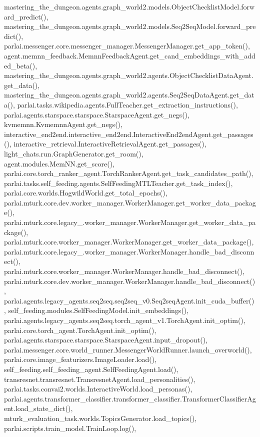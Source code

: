 mastering\+\_\+the\+\_\+dungeon.\+agents.\+graph\+\_\+world2.\+models.\+Object\+Checklist\+Model.\+forward\+\_\+predict(), mastering\+\_\+the\+\_\+dungeon.\+agents.\+graph\+\_\+world2.\+models.\+Seq2\+Seq\+Model.\+forward\+\_\+predict(), parlai.\+messenger.\+core.\+messenger\+\_\+manager.\+Messenger\+Manager.\+get\+\_\+app\+\_\+token(), agent.\+memnn\+\_\+feedback.\+Memnn\+Feedback\+Agent.\+get\+\_\+cand\+\_\+embeddings\+\_\+with\+\_\+added\+\_\+beta(), mastering\+\_\+the\+\_\+dungeon.\+agents.\+graph\+\_\+world2.\+agents.\+Object\+Checklist\+Data\+Agent.\+get\+\_\+data(), mastering\+\_\+the\+\_\+dungeon.\+agents.\+graph\+\_\+world2.\+agents.\+Seq2\+Seq\+Data\+Agent.\+get\+\_\+data(), parlai.\+tasks.\+wikipedia.\+agents.\+Full\+Teacher.\+get\+\_\+extraction\+\_\+instructions(), parlai.\+agents.\+starspace.\+starspace.\+Starspace\+Agent.\+get\+\_\+negs(), kvmemnn.\+Kvmemnn\+Agent.\+get\+\_\+negs(), interactive\+\_\+end2end.\+interactive\+\_\+end2end.\+Interactive\+End2end\+Agent.\+get\+\_\+passages(), interactive\+\_\+retrieval.\+Interactive\+Retrieval\+Agent.\+get\+\_\+passages(), light\+\_\+chats.\+run.\+Graph\+Generator.\+get\+\_\+room(), agent.\+modules.\+Mem\+N\+N.\+get\+\_\+score(), parlai.\+core.\+torch\+\_\+ranker\+\_\+agent.\+Torch\+Ranker\+Agent.\+get\+\_\+task\+\_\+candidates\+\_\+path(), parlai.\+tasks.\+self\+\_\+feeding.\+agents.\+Self\+Feeding\+M\+T\+L\+Teacher.\+get\+\_\+task\+\_\+index(), parlai.\+core.\+worlds.\+Hogwild\+World.\+get\+\_\+total\+\_\+epochs(), parlai.\+mturk.\+core.\+dev.\+worker\+\_\+manager.\+Worker\+Manager.\+get\+\_\+worker\+\_\+data\+\_\+package(), parlai.\+mturk.\+core.\+legacy\+\_.\+worker\+\_\+manager.\+Worker\+Manager.\+get\+\_\+worker\+\_\+data\+\_\+package(), parlai.\+mturk.\+core.\+worker\+\_\+manager.\+Worker\+Manager.\+get\+\_\+worker\+\_\+data\+\_\+package(), parlai.\+mturk.\+core.\+legacy\+\_.\+worker\+\_\+manager.\+Worker\+Manager.\+handle\+\_\+bad\+\_\+disconnect(), parlai.\+mturk.\+core.\+worker\+\_\+manager.\+Worker\+Manager.\+handle\+\_\+bad\+\_\+disconnect(), parlai.\+mturk.\+core.\+dev.\+worker\+\_\+manager.\+Worker\+Manager.\+handle\+\_\+bad\+\_\+disconnect(), parlai.\+agents.\+legacy\+\_\+agents.\+seq2seq.\+seq2seq\+\_\+v0.\+Seq2seq\+Agent.\+init\+\_\+cuda\+\_\+buffer(), self\+\_\+feeding.\+modules.\+Self\+Feeding\+Model.\+init\+\_\+embeddings(), parlai.\+agents.\+legacy\+\_\+agents.\+seq2seq.\+torch\+\_\+agent\+\_\+v1.\+Torch\+Agent.\+init\+\_\+optim(), parlai.\+core.\+torch\+\_\+agent.\+Torch\+Agent.\+init\+\_\+optim(), parlai.\+agents.\+starspace.\+starspace.\+Starspace\+Agent.\+input\+\_\+dropout(), parlai.\+messenger.\+core.\+world\+\_\+runner.\+Messenger\+World\+Runner.\+launch\+\_\+overworld(), parlai.\+core.\+image\+\_\+featurizers.\+Image\+Loader.\+load(), self\+\_\+feeding.\+self\+\_\+feeding\+\_\+agent.\+Self\+Feeding\+Agent.\+load(), transresnet.\+transresnet.\+Transresnet\+Agent.\+load\+\_\+personalities(), parlai.\+tasks.\+convai2.\+worlds.\+Interactive\+World.\+load\+\_\+personas(), parlai.\+agents.\+transformer\+\_\+classifier.\+transformer\+\_\+classifier.\+Transformer\+Classifier\+Agent.\+load\+\_\+state\+\_\+dict(), mturk\+\_\+evaluation\+\_\+task.\+worlds.\+Topics\+Generator.\+load\+\_\+topics(), parlai.\+scripts.\+train\+\_\+model.\+Train\+Loop.\+log(), 
